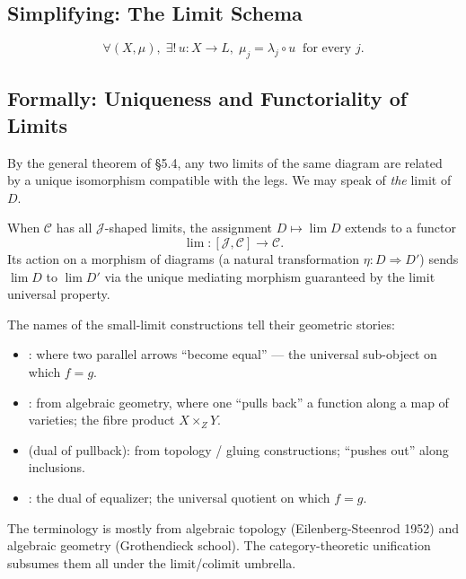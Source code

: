 \subsection{Simplifying: The Limit Schema}

\begin{equation*}
  \boxed{\;
  \forall (X, \mu),\;
  \exists !\, u : X \to L,\;
  \mu_j = \lambda_j \circ u \;\;\text{for every } j.
  \;}
\end{equation*}

\subsection{Formally: Uniqueness and Functoriality of Limits}

By the general theorem of \S5.4, any two limits of the same diagram are
related by a unique isomorphism compatible with the legs. We may speak
of \emph{the} limit of $D$.

When $\mathcal{C}$ has all $\mathcal{J}$-shaped limits, the assignment
$D \mapsto \lim D$ extends to a functor
\begin{equation*}
  \lim : [\mathcal{J}, \mathcal{C}] \to \mathcal{C}.
\end{equation*}
Its action on a morphism of diagrams (a natural transformation
$\eta : D \Rightarrow D'$) sends $\lim D$ to $\lim D'$ via the unique
mediating morphism guaranteed by the limit universal property.


\begin{nameorigin}
The names of the small-limit constructions tell their geometric stories:
\begin{itemize}
  \item {}: where two parallel arrows ``become equal'' —
        the universal sub-object on which $f = g$.
  \item {}: from algebraic geometry, where one ``pulls
        back'' a function along a map of varieties; the fibre product
        $X \times_Z Y$.
  \item {} (dual of pullback): from topology / gluing
        constructions; ``pushes out'' along inclusions.
  \item {}: the dual of equalizer; the universal
        quotient on which $f = g$.
\end{itemize}
The terminology is mostly from algebraic topology (Eilenberg-Steenrod
1952) and algebraic geometry (Grothendieck school). The category-theoretic
unification subsumes them all under the limit/colimit umbrella.
\end{nameorigin}

